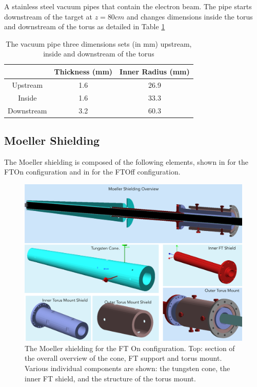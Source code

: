 A stainless steel vacuum pipes that contain the electron beam. The pipe starts downstream of the target at $z=80cm$
and changes dimensions inside the torus and downstream of the torus as detailed in Table \ref{tab:beampipe}

\begin{table}[h]
	\begin{center}
		\begin{tabular}{| c | c | c |}
			\hline \hline
			                & Thickness (mm) & Inner Radius (mm)   \\
			\hline
              Upstream      &    1.6     &    26.9 \\
              Inside        &    1.6     &    33.3 \\
            Downstream      &    3.2     &    60.3 \\
			\hline \hline
		\end{tabular}
	\end{center}
	\caption{The vacuum pipe three dimensions sets (in mm) upstream, inside and downstream of the torus}\label{tab:beampipe}
\end{table}


\subsection{Moeller Shielding}
The Moeller shielding is composed of the following elements, shown in  for the FTOn configuration
and in  for the FTOff configuration.

\begin{figure}
	\centering
	\includegraphics[width=0.98\columnwidth,keepaspectratio]{img/moellerShieldingFTOn.png}
	\caption{The Moeller shielding for the FT On configuration. Top: section of the overall overview of the cone, FT support and torus mount.
		     Various individual components are shown: the tungsten cone, the inner FT shield, and the structure of the torus mount.}
	\label{fig:moellerShieldingFTOn}
\end{figure}


